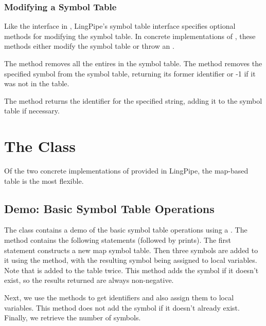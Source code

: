 \subsubsection{Modifying a Symbol Table}

Like the  interface in , LingPipe's
symbol table interface specifies optional methods for modifying the
symbol table.  In concrete implementations of ,
these methods either modify the symbol table or throw an
.

The method  removes all the entires in the symbol table.
The method  removes the specified symbol
from the symbol table, returning its former identifier or -1 if it
was not in the table.  

The method  returns the identifier
for the specified string, adding it to the symbol table if necessary.



\section{The  Class}\label{section:symbol-map-symbol-table}

Of the two concrete implementations of  provided in
LingPipe, the map-based table is the most flexible.  

\subsection{Demo: Basic Symbol Table Operations}

The class  contains a demo of the basic symbol
table operations using a .  The 
method contains the following statements (followed by prints).
%
%
The first statement constructs a new map symbol table.  Then three
symbols are added to it using the  method, with
the resulting symbol being assigned to local variables.  Note that
 is added to the table twice.  This method adds the
symbol if it doesn't exist, so the results returned are always
non-negative.

Next, we use the  methods to get identifiers
and also assign them to local variables.  This method does not
add the symbol if it doesn't already exist.  Finally, we retrieve
the number of symbols.

